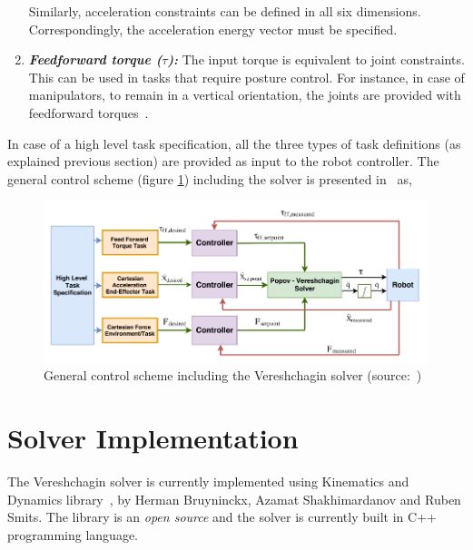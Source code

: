 \begin{enumerate}
	Similarly, acceleration constraints can be defined in all six dimensions. Correspondingly, the acceleration energy vector must be specified. 
	
	\item \textit{\textbf{Feedforward torque ($\tau$):}} The input torque is equivalent to joint constraints. This can be used in tasks that require posture control. For instance, in case of manipulators, to remain in a vertical orientation, the joints are provided with feedforward torques~\cite{sentis2005synthesis}.
	
	\end{enumerate}
	
	In case of a high level task specification, all the three types of task definitions (as explained previous section) are provided as input to the robot controller. The general control scheme (figure \ref{fig:control-scheme-solver}) including the solver is presented in~\cite{vukcevic2018extending} as,
	
	\begin{figure}[h!]
		\label{fig:control-scheme-solver}
		\includegraphics[scale=0.5]{images/control-scheme-solver.png}
		\caption{General control scheme including the Vereshchagin solver (source:~\cite{vukcevic2018extending})}
	\end{figure}

\section{Solver Implementation}

The Vereshchagin solver is currently implemented using Kinematics and Dynamics library~\cite{KDLopensource}, by Herman Bruyninckx, Azamat Shakhimardanov and Ruben Smits. The library is an \textit{open source} and the solver is currently built in C++ programming language. 




